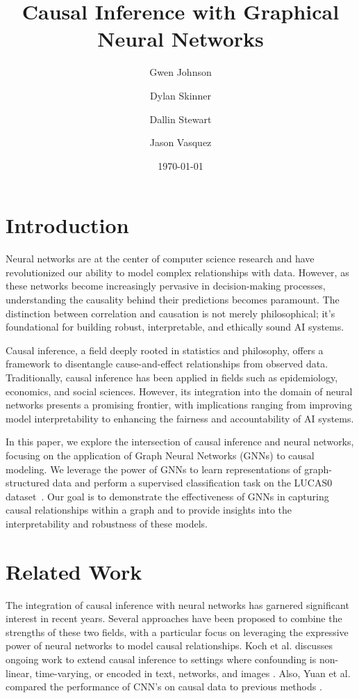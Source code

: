 \documentclass{article}
\begin{document}
\title{Causal Inference with Graphical Neural Networks}
\author{Gwen Johnson\and Dylan Skinner\and Dallin Stewart\and Jason Vasquez}
\date{\today}
\maketitle

\section{Introduction}
\label{intro}
Neural networks are at the center of computer science research and have revolutionized our ability to model complex relationships with data.
However, as these networks become increasingly pervasive in decision-making processes, understanding the causality behind their predictions becomes paramount. 
The distinction between correlation and causation is not merely philosophical; it's foundational for building robust, interpretable, and ethically sound AI systems.

Causal inference, a field deeply rooted in statistics and philosophy, offers a framework to disentangle cause-and-effect relationships from observed data. 
Traditionally, causal inference has been applied in fields such as epidemiology, economics, and social sciences. 
However, its integration into the domain of neural networks presents a promising frontier, with implications ranging from improving model interpretability to enhancing the fairness and accountability of AI systems.

In this paper, we explore the intersection of causal inference and neural networks, focusing on the application of Graph Neural Networks (GNNs) to causal modeling.
We leverage the power of GNNs to learn representations of graph-structured data and perform a supervised classification task on the LUCAS0 dataset~\cite{lucas_dataset}.
Our goal is to demonstrate the effectiveness of GNNs in capturing causal relationships within a graph and to provide insights into the interpretability and robustness of these models.

\section{Related Work}
\label{related}
The integration of causal inference with neural networks has garnered significant interest in recent years.
Several approaches have been proposed to combine the strengths of these two fields, with a particular focus on leveraging the expressive power of neural networks to model causal relationships.
Koch et al. discusses ongoing work to extend causal inference to settings where confounding is non-linear, time-varying, or encoded in text, networks, and images \cite{koch2023deep}.
Also, Yuan et al. compared the performance of CNN's on causal data to previous methods \cite{yuan2020causal}.
\end{document}
